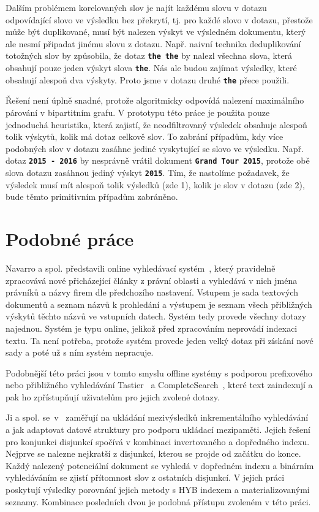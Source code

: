 \documentclass[11pt,letterpaper,oneside,openright]{book}
\newcommand{\bftt}[1]{\texttt{\textbf{#1}}}
\begin{document}
Dalším problémem korelovaných slov je najít každému slovu v dotazu odpovídající
slovo ve výsledku bez překrytí, tj. pro každé slovo v dotazu, přestože může být
duplikované, musí být nalezen výskyt ve výsledném dokumentu, který ale nesmí
připadat jinému slovu z dotazu. Např. naivní technika deduplikování totožných
slov by způsobila, že dotaz \bftt{the the} by nalezl všechna slova, která
obsahují pouze jeden výskyt slova \bftt{the}. Nás ale budou zajímat výsledky,
které obsahují alespoň dva výskyty. Proto jsme v dotazu druhé \bftt{the} přece
použili.

Řešení není úplně snadné, protože algoritmicky odpovídá nalezení maximálního
párování v bipartitním grafu. V prototypu této práce je použita pouze
jednoduchá heuristika, která zajistí, že neodfiltrovaný výsledek obsahuje
alespoň tolik výskytů, kolik má dotaz celkově slov. To zabrání případům, kdy
více podobných slov v dotazu zasáhne jediné vyskytující se slovo ve výsledku.
Např. dotaz \bftt{2015 - 2016} by nesprávně vrátil dokument \bftt{Grand Tour
2015}, protože obě slova dotazu zasáhnou jediný výskyt \bftt{2015}. Tím, že
nastolíme požadavek, že výsledek musí mít alespoň tolik výsledků (zde 1), kolik
je slov v dotazu (zde 2), bude těmto primitivním případům zabráněno.

\section{Podobné práce}
Navarro a spol. představili online vyhledávací
systém~\cite{Navarro:2003:MFA:638683.638685}, který pravidelně zpracovává nové
přicházející články z právní oblasti a vyhledává v nich jména právníků a názvy
firem dle předchozího nastavení. Vstupem je sada textových dokumentů a seznam
názvů k prohledání a výstupem je seznam všech přibližných výskytů těchto názvů
ve vstupních datech. Systém tedy provede všechny dotazy najednou. Systém je
typu online, jelikož před zpracováním neprovádí indexaci textu. Ta není
potřeba, protože systém provede jeden velký dotaz při získání nové sady a poté
už s ním systém nepracuje.

Podobnější této práci jsou v tomto smyslu offline systémy s podporou
prefixového nebo přibližného vyhledávání
Tastier~\cite{Ji:2009:EIF:1526709.1526760} a
CompleteSearch~\cite{Bast:2006:TLF:1148170.1148234}, které text zaindexují a pak
ho zpřístupňují uživatelům pro jejich zvolené dotazy.

Ji a spol. se~v~\cite{Ji:2009:EIF:1526709.1526760} zaměřují na ukládání
mezivýsledků inkrementálního vyhledávání a jak adaptovat datové struktury pro
podporu ukládací mezipaměti. Jejich řešení pro konjunkci disjunkcí spočívá v
kombinaci invertovaného a dopředného indexu. Nejprve se nalezne nejkratší z
disjunkcí, kterou se projde od začátku do konce. Každý nalezený potenciální
dokument se vyhledá v dopředném indexu a binárním vyhledáváním se zjistí
přítomnost slov z ostatních disjunkcí. V jejich práci poskytují výsledky
porovnání jejich metody s HYB indexem a materializovanými seznamy. Kombinace
posledních dvou je podobná přístupu zvoleném v této práci.
\end{document}
